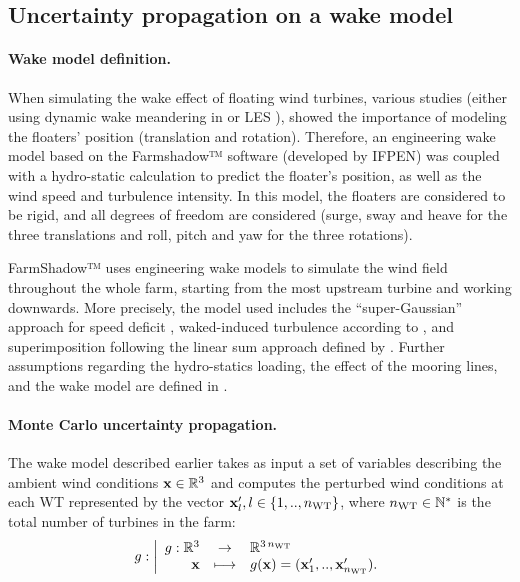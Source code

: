 \subsection{Uncertainty propagation on a wake model}\label{sec:UQ-wake}

\paragraph{Wake model definition.}
When simulating the wake effect of floating wind turbines, various studies (either using dynamic wake meandering in \citealp{wise_2020} or LES \citealp{johlas_2020_wake_LES}), showed the importance of modeling the floaters' position (translation and rotation). 
Therefore, an engineering wake model based on the Farmshadow™ software (developed by IFPEN) was coupled with a hydro-static calculation to predict the floater's position, as well as the wind speed and turbulence intensity. 
In this model, the floaters are considered to be rigid, and all degrees of freedom are considered (surge, sway and heave for the three translations and roll, pitch and yaw for the three rotations). 

FarmShadow™ uses engineering wake models to simulate the wind field throughout the whole farm, starting from the most upstream turbine and working downwards. 
More precisely, the model used includes the ``super-Gaussian'' approach for speed deficit \citep{blondel_2020}, waked-induced turbulence according to \citet{quian_2018}, and superimposition following the linear sum approach defined by \citet{zong_2020}.    
Further assumptions regarding the hydro-statics loading, the effect of the mooring lines, and the wake model are defined in \citet{lovera_fekhari_2023}.


\paragraph{Monte Carlo uncertainty propagation.}

The wake model described earlier takes as input a set of variables describing the ambient wind conditions ${\bf x} \in \mathbb{R}^3$ and computes the perturbed wind conditions at each WT represented by the vector ${\bf x} _l', l \in \left\{1,..,n_{\mathrm{WT}}\right\}$, where $n_{\mathrm{WT}} \in \mathbb{N}^*$ is the total number of turbines in the farm:
\begin{equation}
    g : \bigg|
        \begin{array}{rcl}
            g:\mathbb{R}^3 & \rightarrow & \mathbb{R}^{3 \, n_{\mathrm{WT}}} \\
            {\bf x} &\longmapsto & g({\bf x}) = ({\bf x}_1',..,{\bf x}_{n_{\mathrm{WT}}}').
        \end{array}
    \end{equation}

